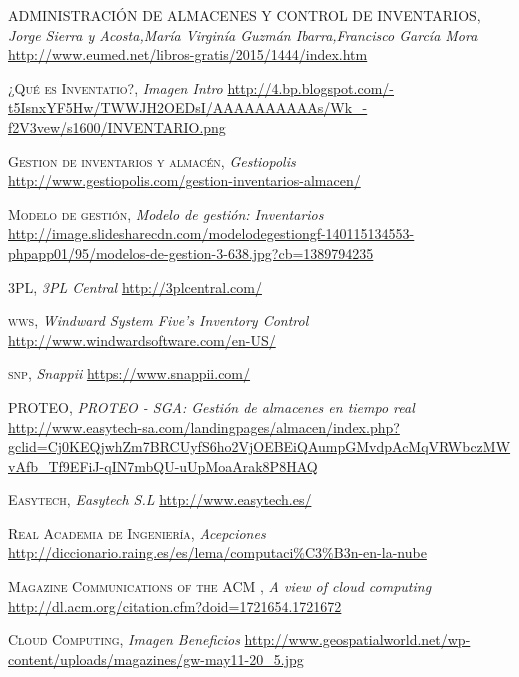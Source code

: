\documentclass[a4paper,11pt]{book}
\begin{document}
\begin{thebibliography}{aaaa}



 \textsc{ADMINISTRACIÓN DE ALMACENES Y CONTROL DE INVENTARIOS},
\textit{Jorge Sierra y Acosta,María Virginía Guzmán Ibarra,Francisco García Mora}
\url{http://www.eumed.net/libros-gratis/2015/1444/index.htm} 

 \textsc{¿Qué es Inventatio?},
\textit{Imagen Intro}
\url{http://4.bp.blogspot.com/-t5IsnxYF5Hw/TWWJH2OEDsI/AAAAAAAAAAs/Wk_-f2V3vew/s1600/INVENTARIO.png} 


 \textsc{Gestion de inventarios y almacén},
\textit{Gestiopolis}
\url{http://www.gestiopolis.com/gestion-inventarios-almacen/} 


 \textsc{Modelo de gestión},
\textit{Modelo de gestión: Inventarios}
\url{http://image.slidesharecdn.com/modelodegestiongf-140115134553-phpapp01/95/modelos-de-gestion-3-638.jpg?cb=1389794235}

 \textsc{3PL},
\textit{3PL Central}
\url{http://3plcentral.com/} 

 \textsc{wws},
\textit{Windward System Five's Inventory Control}
\url{http://www.windwardsoftware.com/en-US/}

 \textsc{snp},
\textit{Snappii}
\url{https://www.snappii.com/}

 \textsc{PROTEO},
\textit{PROTEO - SGA: Gestión de almacenes en tiempo real}
\url{http://www.easytech-sa.com/landingpages/almacen/index.php?gclid=Cj0KEQjwhZm7BRCUyfS6ho2VjOEBEiQAumpGMvdpAcMqVRWbczMWvAfb_Tf9EFiJ-qIN7mbQU-uUpMoaArak8P8HAQ}

 \textsc{Easytech},
\textit{Easytech S.L}
\url{http://www.easytech.es/}



 \textsc{Real Academia de Ingeniería},
\textit{Acepciones}
\url{http://diccionario.raing.es/es/lema/computaci\%C3\%B3n-en-la-nube}


 \textsc{Magazine Communications of the ACM },
\textit{A view of cloud computing}
\url{http://dl.acm.org/citation.cfm?doid=1721654.1721672}


 \textsc{Cloud Computing},
\textit{Imagen Beneficios}
\url{http://www.geospatialworld.net/wp-content/uploads/magazines/gw-may11-20_5.jpg}


\end{thebibliography}
\end{document}
